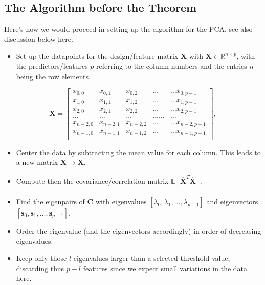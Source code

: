 \documentclass[%
oneside,                 %
final,                   %
10pt]{article}
\begin{document}
\subsection{The Algorithm before the Theorem}

Here's how we would proceed in setting up the algorithm for the PCA, see also discussion below here. 
\begin{itemize}
\item Set up the datapoints for the design/feature matrix $\bm{X}$ with $\bm{X}\in {\mathbb{R}}^{n\times p}$, with the predictors/features $p$  referring to the column numbers and the entries $n$ being the row elements.
\end{itemize}

\noindent
\[
\bm{X}=\begin{bmatrix}
x_{0,0} & x_{0,1} & x_{0,2}& \dots & \dots x_{0,p-1}\\
x_{1,0} & x_{1,1} & x_{1,2}& \dots & \dots x_{1,p-1}\\
x_{2,0} & x_{2,1} & x_{2,2}& \dots & \dots x_{2,p-1}\\
\dots & \dots & \dots & \dots \dots & \dots \\
x_{n-2,0} & x_{n-2,1} & x_{n-2,2}& \dots & \dots x_{n-2,p-1}\\
x_{n-1,0} & x_{n-1,1} & x_{n-1,2}& \dots & \dots x_{n-1,p-1}\\
\end{bmatrix},
\]
\begin{itemize}
\item Center the data by subtracting the mean value for each column. This leads to a new matrix $\bm{X}\rightarrow \overline{\bm{X}}$.

\item Compute then the covariance/correlation matrix $\mathbb{E}[\overline{\bm{X}}^T\overline{\bm{X}}]$.

\item Find the eigenpairs of $\bm{C}$ with eigenvalues $[\lambda_0,\lambda_1,\dots,\lambda_{p-1}]$ and eigenvectors $[\bm{s}_0,\bm{s}_1,\dots,\bm{s}_{p-1}]$.

\item Order the eigenvalue (and the eigenvectors accordingly) in order of decreasing eigenvalues.

\item Keep only those $l$ eigenvalues larger than a selected threshold value, discarding thus $p-l$ features since we expect small variations in the data here.
\end{itemize}
\end{document}
